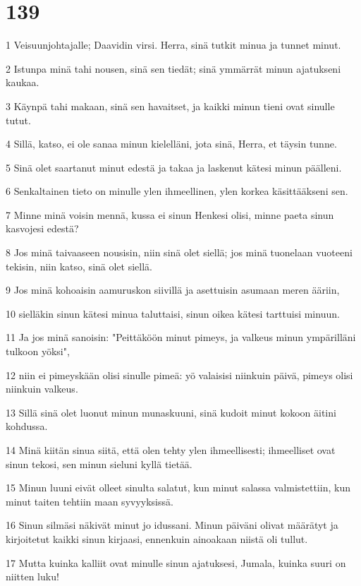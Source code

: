 \chapter{139}

\par 1 Veisuunjohtajalle; Daavidin virsi. Herra, sinä tutkit minua ja tunnet minut.
\par 2 Istunpa minä tahi nousen, sinä sen tiedät; sinä ymmärrät minun ajatukseni kaukaa.
\par 3 Käynpä tahi makaan, sinä sen havaitset, ja kaikki minun tieni ovat sinulle tutut.
\par 4 Sillä, katso, ei ole sanaa minun kielelläni, jota sinä, Herra, et täysin tunne.
\par 5 Sinä olet saartanut minut edestä ja takaa ja laskenut kätesi minun päälleni.
\par 6 Senkaltainen tieto on minulle ylen ihmeellinen, ylen korkea käsittääkseni sen.
\par 7 Minne minä voisin mennä, kussa ei sinun Henkesi olisi, minne paeta sinun kasvojesi edestä?
\par 8 Jos minä taivaaseen nousisin, niin sinä olet siellä; jos minä tuonelaan vuoteeni tekisin, niin katso, sinä olet siellä.
\par 9 Jos minä kohoaisin aamuruskon siivillä ja asettuisin asumaan meren ääriin,
\par 10 sielläkin sinun kätesi minua taluttaisi, sinun oikea kätesi tarttuisi minuun.
\par 11 Ja jos minä sanoisin: "Peittäköön minut pimeys, ja valkeus minun ympärilläni tulkoon yöksi",
\par 12 niin ei pimeyskään olisi sinulle pimeä: yö valaisisi niinkuin päivä, pimeys olisi niinkuin valkeus.
\par 13 Sillä sinä olet luonut minun munaskuuni, sinä kudoit minut kokoon äitini kohdussa.
\par 14 Minä kiitän sinua siitä, että olen tehty ylen ihmeellisesti; ihmeelliset ovat sinun tekosi, sen minun sieluni kyllä tietää.
\par 15 Minun luuni eivät olleet sinulta salatut, kun minut salassa valmistettiin, kun minut taiten tehtiin maan syvyyksissä.
\par 16 Sinun silmäsi näkivät minut jo idussani. Minun päiväni olivat määrätyt ja kirjoitetut kaikki sinun kirjaasi, ennenkuin ainoakaan niistä oli tullut.
\par 17 Mutta kuinka kalliit ovat minulle sinun ajatuksesi, Jumala, kuinka suuri on niitten luku!
